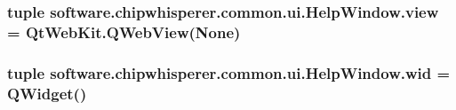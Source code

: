\subsubsection[{view}]{\setlength{\rightskip}{0pt plus 5cm}tuple software.\+chipwhisperer.\+common.\+ui.\+Help\+Window.\+view = Qt\+Web\+Kit.\+Q\+Web\+View(None)}\label{namespacesoftware_1_1chipwhisperer_1_1common_1_1ui_1_1HelpWindow_a089170c473735215005185584cf7b156}
\hypertarget{namespacesoftware_1_1chipwhisperer_1_1common_1_1ui_1_1HelpWindow_a5facd763a64693533133ce0867f8e297}{}
\subsubsection[{wid}]{\setlength{\rightskip}{0pt plus 5cm}tuple software.\+chipwhisperer.\+common.\+ui.\+Help\+Window.\+wid = Q\+Widget()}\label{namespacesoftware_1_1chipwhisperer_1_1common_1_1ui_1_1HelpWindow_a5facd763a64693533133ce0867f8e297}
